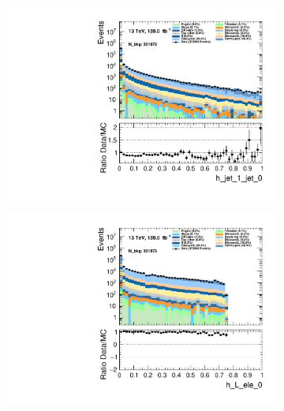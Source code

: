 \begin{figure}
    \centering
    \begin{subfigure}{.49\textwidth}
        \includegraphics[width=\textwidth]{Figures/MC_Data_comp/h_jet_1_jet_0.pdf}
        \caption{}
        \label{fig:et}
    \end{subfigure}
    \hfill
    \begin{subfigure}{.49\textwidth}
        \includegraphics[width=\textwidth]{Figures/MC_Data_comp/h_L_ele_0.pdf}
        \caption{ }
        \label{fig:flcp}
    \end{subfigure}
    \hfill 
    \begin{subfigure}{.49\textwidth}

\end{subfigure}
\end{figure}

